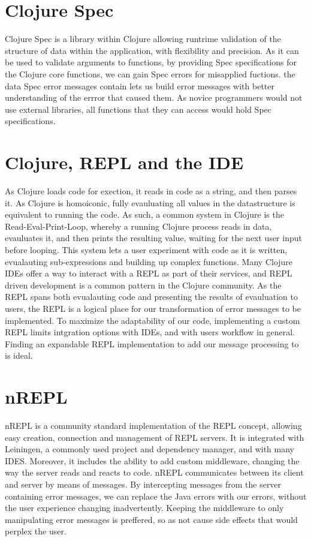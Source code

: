 \documentclass[12pt]{article}
\begin{document}
\section{Clojure Spec}
Clojure Spec is a library within Clojure allowing runtrime validation
of the structure of data within the application, with flexibility and precision.
As it can be used to validate arguments to functions, by providing Spec
 specifications for the Clojure core functions, we can gain Spec errors
 for misapplied fuctions. the data Spec error messages contain lets us build
 error messages with better understanding of the errror that caused them.
 As novice programmers would not use external libraries,
 all functions that they can access would hold Spec specifications.


\section{Clojure, REPL and the IDE}
As Clojure loads code for exection, it reads in code as a string,
and then parses it. As Clojure is homoiconic, fully evauluating all values in the datastructure
is equivalent to running the code.
As such, a common system in Clojure is the Read-Eval-Print-Loop, whereby a running Clojure
process reads in data, evauluates it, and then prints the resulting value,
 waiting for the next user input before looping.
This system lets a user experiment with code as it is written,
 evualauting sub-expressions and building up complex functions.
Many Clojure IDEs offer a way to interact with a REPL as part of their services,
 and REPL driven development is a common pattern in the Clojure community.
 As the REPL spans both evualauting code and presenting the results of evauluation to users,
 the REPL is a logical place for our transformation of error messages to be implemented.
 To maximize the adaptability of our code, implementing a custom REPL limits intgration
 options with IDEs, and with users workflow in general.
  Finding an expandable REPL implementation to add our message processing to
  is ideal.


\section{nREPL}
nREPL is a community standard implementation of the REPL concept,
allowing easy creation, connection and management of REPL servers.
It is integrated with Leiningen, a commonly used project and dependency manager,
 and with many IDES. Moreover, it includes the ability to add custom middleware,
  changing the way the server reads and reacts to code.
 nREPL communicates between its client and server by means of messages.
 By intercepting messages from the server containing error messages,
 we can replace the Java errors with our errors,
  without the user experience changing inadvertently.
  Keeping the middleware to only manipulating error messages
  is preffered, so as not cause side effects that would perplex the user.
\end{document}
